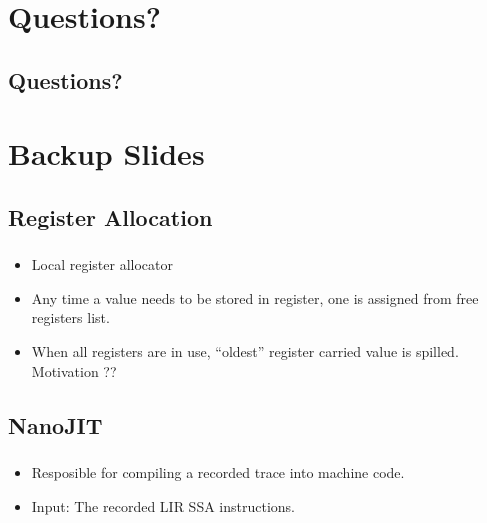 \documentclass[mathserif,10pt]{beamer}
\newcommand{\cmt}[1]{}
\begin{document}
\section{Questions?}
\subsection{Questions?}
\frame
{}

\section{Backup Slides}

\subsection{Register Allocation}
\frame
{
  \frametitle{\subsecname}
  \begin{itemize}
    \item Local register allocator
    \item Any time a value needs to be stored in register, one is assigned from free registers list. 
    \item When all registers are in use, ``oldest'' register carried value is spilled. Motivation ??
    \cmt{
        With that single spill, a register will be freed for a long amount of time.
    }
  \end{itemize}  
  \begin{figure}[h]
  \centering
  \end{figure}
}

\subsection{NanoJIT}
\frame
{
  \frametitle{\subsecname}
  \begin{itemize}
    \item Resposible for compiling a recorded trace into machine code.
    \item Input: The recorded LIR SSA instructions.
  \end{itemize}  
}
\end{document}
